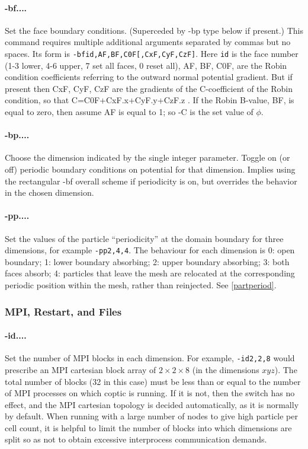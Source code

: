 \documentclass[12pt]{article}
\begin{document}
\paragraph{-bf....} Set the face boundary conditions. (Superceded by
-bp type below if present.) This command requires multiple additional
arguments separated by commas but no spaces. Its form is
\verb!-bfid,AF,BF,C0F[,CxF,CyF,CzF]!. Here \verb!id! is the face
number (1-3 lower, 4-6 upper, 7 set all faces, 0 reset all), AF, BF,
C0F, are the Robin condition coefficients referring to the outward
normal potential gradient. But if present then CxF, CyF, CzF are the
gradients of the C-coefficient of the Robin condition, so that
C=C0F+CxF.x+CyF.y+CzF.z . If the Robin B-value, BF, is equal to zero,
then assume AF is equal to 1; so -C is the set value of $\phi$.

\paragraph{-bp....} Choose the dimension indicated by the single
integer parameter. Toggle on (or off) periodic boundary conditions on
potential for that dimension. Implies using the rectangular -bf
overall scheme if periodicity is on, but overrides the behavior in the
chosen dimension.

\paragraph{-pp....} Set the values of the particle ``periodicity'' at
the domain boundary for three dimensions, for example \verb!-pp2,4,4!.
The behaviour for each dimension is 0: open boundary; 1: lower
boundary absorbing; 2: upper boundary absorbing; 3: both faces absorb;
4: particles that leave the mesh are relocated at the corresponding
periodic position within the mesh, rather than reinjected. See
\ref{partperiod}.

\subsubsection*{MPI, Restart, and Files}

\paragraph{-id....} Set the number of MPI blocks in each
dimension. For example, \verb!-id2,2,8! would prescribe an MPI
cartesian block array of $2\times2\times8$ (in the dimensions $xyz$).
The total number of blocks (32 in this case) must be less than or
equal to the number of MPI processes on which coptic is running. If it
is not, then the switch has no effect, and the MPI cartesian topology
is decided automatically, as it is normally by default. When running
with a large number of nodes to give high particle per cell count, it
is helpful to limit the number of blocks into which dimensions are
split so as not to obtain excessive interprocess communication
demands.
\end{document}
